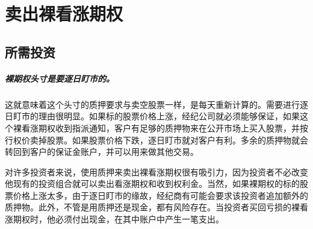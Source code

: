 \chapter{卖出裸看涨期权}
\section{所需投资}
\paragraph{裸期权头寸是要逐日盯市的。}这就意味着这个头寸的质押要求与卖空股票一样，是每天重新计算的。需要进行逐日盯市的理由很明显。如果标的股票价格上涨，经纪公司就必须能够保证，如果这个裸看涨期权收到指派通知，客户有足够的质押物来在公开市场上买入股票，并按行权价卖掉股票。如果股票价格下跌，逐日盯市就对客户有利。多余的质押物就会转回到客户的保证金账户，并可以用来做其他交易。

对许多投资者来说，使用质押来卖出裸看涨期权很有吸引力，因为投资者不必改变他现有的投资组合就可以卖出看涨期权和收到权利金。当然，如果裸期权的标的股票价格上涨太多，由于逐日盯市的缘故，经纪商有可能会要求该投资者追加额外的质押物。此外，不管是用质押还是现金，都有风险存在。当投资者买回亏损的裸看涨期权时，他必须付出现金，在其中账户中产生一笔支出。